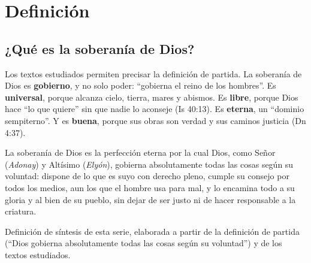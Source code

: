 \documentclass[11pt,letterpaper]{article}
\newcommand{\destacar}[1]{\textbf{\textcolor{azul}{#1}}}
\begin{document}
\section{Definición}

\subsection{¿Qué es la soberanía de Dios?}
Los textos estudiados permiten precisar la definición de partida. La soberanía de Dios es \destacar{gobierno}, y no solo poder: ``gobierna el reino de los hombres''. Es \destacar{universal}, porque alcanza cielo, tierra, mares y abismos. Es \destacar{libre}, porque Dios hace ``lo que quiere'' sin que nadie lo aconseje (Is 40:13). Es \destacar{eterna}, un ``dominio sempiterno''. Y es \destacar{buena}, porque sus obras son verdad y sus caminos justicia (Dn 4:37).

\begin{tcolorbox}[colback=azul!5!white,colframe=azul,boxrule=1pt,arc=3pt,title={\small Definición},colbacktitle=azul,coltitle=white]
La soberanía de Dios es la perfección eterna por la cual Dios, como Señor (\emph{Adonay}) y Altísimo (\emph{Elyón}), gobierna absolutamente todas las cosas según su voluntad: dispone de lo que es suyo con derecho pleno, cumple su consejo por todos los medios, aun los que el hombre usa para mal, y lo encamina todo a su gloria y al bien de su pueblo, sin dejar de ser justo ni de hacer responsable a la criatura.
\end{tcolorbox}

\begin{nota}[Precisión]
Definición de síntesis de esta serie, elaborada a partir de la definición de partida (``Dios gobierna absolutamente todas las cosas según su voluntad'') y de los textos estudiados.
\end{nota}
\end{document}
